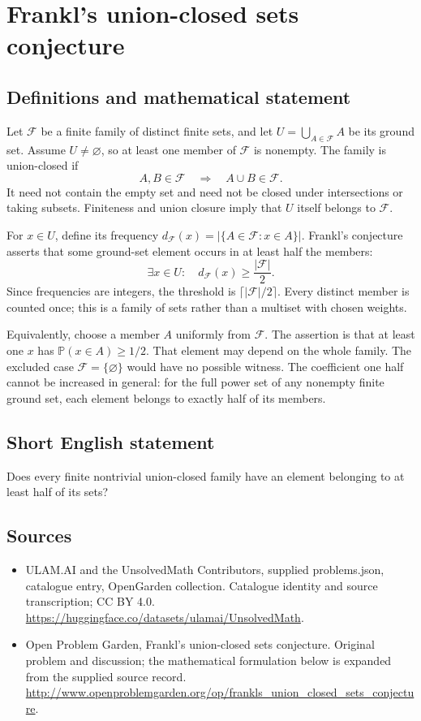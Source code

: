 \documentclass[11pt,a4paper]{article}
\begin{document}
\section*{Frankl's union-closed sets conjecture}\label{statement}

\subsection{Definitions and mathematical statement}
Let $\mathcal F$ be a finite family of distinct finite sets, and let
$U=\bigcup_{A\in\mathcal F}A$ be its ground set. Assume $U\ne\varnothing$,
so at least one member of $\mathcal F$ is nonempty. The family is
union-closed if
\[
                 A,B\in\mathcal F\quad\Longrightarrow\quad
                 A\cup B\in\mathcal F.
\]
It need not contain the empty set and need not be closed under
intersections or taking subsets. Finiteness and union closure imply
that $U$ itself belongs to $\mathcal F$.

For $x\in U$, define its frequency
$d_{\mathcal F}(x)=|\{A\in\mathcal F:x\in A\}|$. Frankl's conjecture
asserts that some ground-set element occurs in at least half the
members:
\[
               \exists x\in U:\quad
               d_{\mathcal F}(x)\ge\frac{|\mathcal F|}{2}.
\]
Since frequencies are integers, the threshold is
$\lceil|\mathcal F|/2\rceil$. Every distinct member is counted once;
this is a family of sets rather than a multiset with chosen weights.

Equivalently, choose a member $A$ uniformly from $\mathcal F$. The
assertion is that at least one $x$ has $\mathbb P(x\in A)\ge1/2$.
That element may depend on the whole family. The excluded case
$\mathcal F=\{\varnothing\}$ would have no possible witness. The
coefficient one half cannot be increased in general: for the full
power set of any nonempty finite ground set, each element belongs to
exactly half of its members.
\subsection{Short English statement}
Does every finite nontrivial union-closed family have an element belonging to at least half of its sets?
\subsection{Sources}
\begin{itemize}
\item[S1] ULAM.AI and the UnsolvedMath Contributors, supplied problems.json, catalogue entry, OpenGarden collection. Catalogue identity and source transcription; CC BY 4.0.
\url{https://huggingface.co/datasets/ulamai/UnsolvedMath}.
\item[S2] Open Problem Garden, Frankl's union-closed sets conjecture. Original problem and discussion; the mathematical formulation below is expanded from the supplied source record.
\url{http://www.openproblemgarden.org/op/frankls_union_closed_sets_conjecture}.
\end{itemize}
\end{document}
